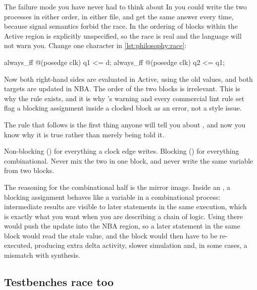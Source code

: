 \begin{gotcha}{The failure mode you have never had to think about}
In \VHDL{} you could write the two processes in either order, in either file,
and get the same answer every time, because signal semantics forbid the race.
In \SV{} the ordering of  blocks within the Active region is
explicitly unspecified, so the race is real and the language will not warn you.
Change one character in \cref{lst:philosophy:race}:

\begin{svcode}
  always_ff @(posedge clk) q1 <= d;
  always_ff @(posedge clk) q2 <= q1;
\end{svcode}

Now both right-hand sides are evaluated in Active, using the old values, and
both targets are updated in NBA. The order of the two blocks is irrelevant.
This is why the rule exists, and it is why 's 
warning and every commercial lint rule set flag a blocking assignment inside a
clocked block as an error, not a style issue.
\end{gotcha}

The rule that follows is the first thing anyone will tell you about \SV{}, and
now you know why it is true rather than merely being told it.

\begin{ruleofthumb}
Non-blocking (\code{<=}) for everything a clock edge writes. Blocking
(\code{=}) for everything combinational. Never mix the two in one
 block, and never write the same variable from two blocks.
\end{ruleofthumb}

The reasoning for the combinational half is the mirror image. Inside an
, a blocking assignment behaves like a \VHDL{} variable in a
combinational process: intermediate results are visible to later statements in
the same execution, which is exactly what you want when you are describing a
chain of logic. Using \code{<=} there would push the update into the NBA
region, so a later statement in the same block would read the stale value, and
the block would then have to be re-executed, producing extra delta activity,
slower simulation and, in some cases, a mismatch with synthesis.

\subsection{Testbenches race too}

